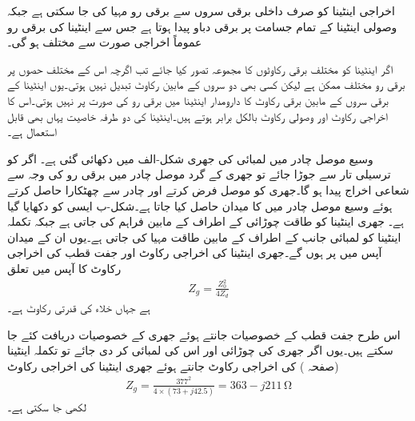 اخراجی اینٹینا کو صرف داخلی برقی سروں سے برقی رو مہیا کی جا سکتی ہے جبکہ وصولی اینٹینا کے تمام جسامت پر برقی دباو پیدا ہوتا ہے جس سے اینٹینا کی برقی رو عموماً اخراجی صورت سے مختلف ہو گی۔

اگر اینٹینا کو مختلف برقی رکاوٹوں کا مجموعہ تصور کیا جائے تب اگرچہ اس کے مختلف حصوں پر برقی رو مختلف ممکن ہے لیکن کسی بھی دو سروں کے مابین رکاوٹ تبدیل نہیں ہوتی۔یوں اینٹینا کے برقی سروں کے مابین برقی رکاوٹ کا دارومدار اینٹینا میں برقی رو کی صورت پر نہیں ہوتی۔اس کا اخراجی رکاوٹ اور وصولی رکاوٹ بالکل برابر ہوتے ہیں۔اینٹینا کی دو طرفہ خاصیت یہاں بھی قابل استعمال ہے۔

وسیع موصل چادر میں  لمبائی کی جھری شکل-الف میں دکھائی گئی ہے۔ اگر  کو ترسیلی تار سے جوڑا جائے تو جھری کے گرد موصل چادر میں برقی رو کی وجہ سے شعاعی اخراج پیدا ہو گا۔جھری کو موصل فرض کرتے اور چادر سے چھٹکارا حاصل کرتے ہوئے وسیع موصل چادر میں  کا میدان حاصل کیا جاتا ہے۔شکل-ب ایسی  کو دکھایا گیا ہے۔ جھری اینٹینا کو طاقت چوڑائی کے اطراف کے مابین فراہم کی جاتی ہے جبکہ تکملہ اینٹینا کو لمبائی جانب کے اطراف کے مابین طاقت مہیا کی جاتی ہے۔یوں ان کے میدان آپس میں  پر ہوں گے۔جھری اینٹینا کی اخراجی رکاوٹ  اور جفت قطب کی اخراجی رکاوٹ  کا آپس میں تعلق
\begin{align}
Z_g = \frac{Z_0^2}{4 Z_{d}}
\end{align}
ہے جہاں  خلاء کی قدرتی رکاوٹ ہے۔

اس طرح جفت قطب کے خصوصیات جانتے ہوئے جھری کے خصوصیات دریافت کئے جا سکتے ہیں۔یوں اگر جھری کی چوڑائی  اور اس کی لمبائی  کر دی جائے تو تکملہ اینٹینا (صفحہ ) کی اخراجی رکاوٹ   جانتے ہوئے جھری اینٹینا کی اخراجی رکاوٹ
\begin{align}
Z_g=\frac{377^2}{4 \times (73+j42.5)}=363-j 211 \, \si{\ohm}
\end{align}
لکھی جا سکتی ہے۔

